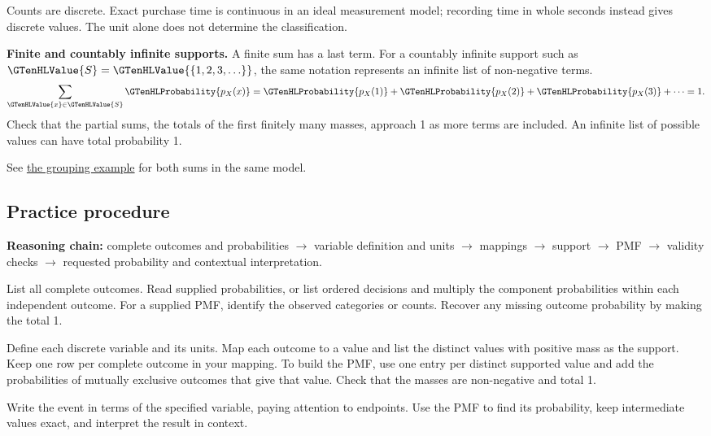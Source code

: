 Counts are discrete. Exact purchase time is continuous in an ideal measurement model; recording time in whole seconds instead gives discrete values. The unit alone does not determine the classification.

\textbf{Finite and countably infinite supports.} A finite sum has a last term. For a countably infinite support such as $\GTenHLValue{S}=\GTenHLValue{\{1,2,3,\ldots\}}$, the same notation represents an infinite list of non-negative terms.
\[
\sum_{\GTenHLValue{x}\in\GTenHLValue{S}}\GTenHLProbability{p_{X}(x)}=\GTenHLProbability{p_{X}(1)}+\GTenHLProbability{p_{X}(2)}+\GTenHLProbability{p_{X}(3)}+\cdots=1.
\]
Check that the partial sums, the totals of the first finitely many masses, approach 1 as more terms are included. An infinite list of possible values can have total probability 1.

See \hyperref[subsec:t2-c1-introductory-general-problem-grouping-outcomes]{the grouping example} for both sums in the same model.


\subsection{Practice procedure}
\label{subsec:t2-c1-practice-procedure}

\textbf{Reasoning chain:} complete outcomes and probabilities $\to$ variable definition and units $\to$ mappings $\to$ support $\to$ PMF $\to$ validity checks $\to$ requested probability and contextual interpretation.

\noindent{} List all complete outcomes. Read supplied probabilities, or list ordered decisions and multiply the component probabilities within each independent outcome. For a supplied PMF, identify the observed categories or counts. Recover any missing outcome probability by making the total 1.

\noindent{} Define each discrete variable and its units. Map each outcome to a value and list the distinct values with positive mass as the support. Keep one row per complete outcome in your mapping. To build the PMF, use one entry per distinct supported value and add the probabilities of mutually exclusive outcomes that give that value. Check that the masses are non-negative and total 1.

\noindent{} Write the event in terms of the specified variable, paying attention to endpoints. Use the PMF to find its probability, keep intermediate values exact, and interpret the result in context.

